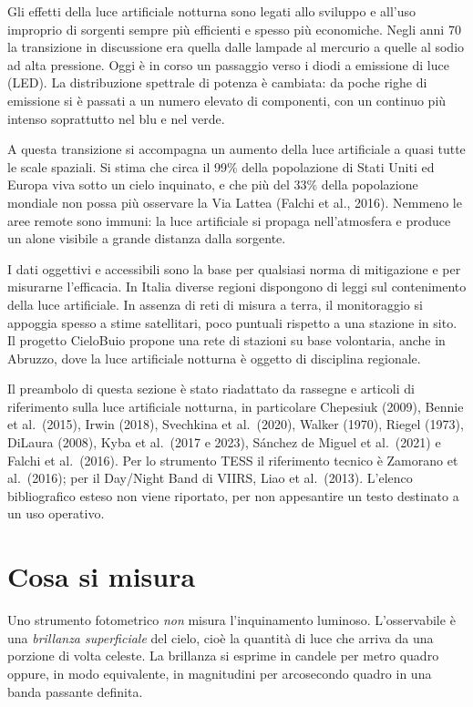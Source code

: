 \documentclass[11pt,a4paper]{report}
\begin{document}
Gli effetti della luce artificiale notturna sono legati allo sviluppo e all'uso improprio di sorgenti sempre più efficienti e spesso più economiche. Negli anni 70 la transizione in discussione era quella dalle lampade al mercurio a quelle al sodio ad alta pressione. Oggi è in corso un passaggio verso i diodi a emissione di luce (LED). La distribuzione spettrale di potenza è cambiata: da poche righe di emissione si è passati a un numero elevato di componenti, con un continuo più intenso soprattutto nel blu e nel verde.

A questa transizione si accompagna un aumento della luce artificiale a quasi tutte le scale spaziali. Si stima che circa il 99\% della popolazione di Stati Uniti ed Europa viva sotto un cielo inquinato, e che più del 33\% della popolazione mondiale non possa più osservare la Via Lattea (Falchi et al., 2016). Nemmeno le aree remote sono immuni: la luce artificiale si propaga nell'atmosfera e produce un alone visibile a grande distanza dalla sorgente.

I dati oggettivi e accessibili sono la base per qualsiasi norma di mitigazione e per misurarne l'efficacia. In Italia diverse regioni dispongono di leggi sul contenimento della luce artificiale. In assenza di reti di misura a terra, il monitoraggio si appoggia spesso a stime satellitari, poco puntuali rispetto a una stazione in sito. Il progetto CieloBuio propone una rete di stazioni su base volontaria, anche in Abruzzo, dove la luce artificiale notturna è oggetto di disciplina regionale.

Il preambolo di questa sezione è stato riadattato da rassegne e articoli di riferimento sulla luce artificiale notturna, in particolare Chepesiuk (2009), Bennie et al.\ (2015), Irwin (2018), Svechkina et al.\ (2020), Walker (1970), Riegel (1973), DiLaura (2008), Kyba et al.\ (2017 e 2023), Sánchez de Miguel et al.\ (2021) e Falchi et al.\ (2016). Per lo strumento TESS il riferimento tecnico è Zamorano et al.\ (2016); per il Day/Night Band di VIIRS, Liao et al.\ (2013). L'elenco bibliografico esteso non viene riportato, per non appesantire un testo destinato a un uso operativo.

\section*{Cosa si misura}

Uno strumento fotometrico \textit{non} misura l'inquinamento luminoso. L'osservabile è una \textit{brillanza superficiale} del cielo, cioè la quantità di luce che arriva da una porzione di volta celeste. La brillanza si esprime in candele per metro quadro oppure, in modo equivalente, in magnitudini per arcosecondo quadro in una banda passante definita.
\end{document}
